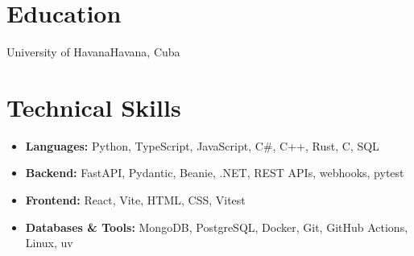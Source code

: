\documentclass[en]{resume}
\begin{document}
\section{Education}
\begin{entries}
              {University of Havana}{Havana, Cuba}
  \begin{bullets}
  \end{bullets}
\end{entries}

\section{Technical Skills}
\begin{itemize}[leftmargin=0.1in, label={}, itemsep=0pt]
  \small
  \item \textbf{Languages:} Python, TypeScript, JavaScript, C\#, C++, Rust, C, SQL
  \item \textbf{Backend:} FastAPI, Pydantic, Beanie, .NET, REST APIs, webhooks, pytest
  \item \textbf{Frontend:} React, Vite, HTML, CSS, Vitest
  \item \textbf{Databases \& Tools:} MongoDB, PostgreSQL, Docker, Git, GitHub Actions, Linux, uv
\end{itemize}
\end{document}
